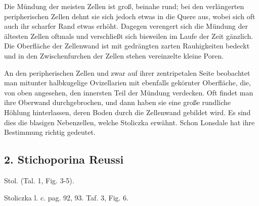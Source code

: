 \documentclass[a4paper, 11pt, oneside, german]{article}
\begin{document}
Die Mündung der meisten Zellen ist groß, beinahe rund; bei den verlängerten peripherischen Zellen dehnt sie sich jedoch etwas in die Quere aus, wobei sich oft auch ihr scharfer Rand etwas erhöht. Dagegen verengert sich die Mündung der ältesten Zellen oftmals und verschließt sich bisweilen im Laufe der Zeit gänzlich. Die Oberfläche der Zellenwand ist mit gedrängten zarten Rauhigkeiten bedeckt und in den Zwischenfurchen der Zellen stehen vereinzelte kleine Poren.

An den peripherischen Zellen und zwar auf ihrer zentripetalen Seite beobachtet man mitunter halbkugelige Ovizellarien mit ebenfalls gekörnter Oberfläche, die, von oben angesehen, den innersten Teil der Mündung verdecken. Oft findet man ihre Oberwand durchgebrochen, und dann haben sie eine große rundliche Höhlung hinterlassen, deren Boden durch die Zellenwand gebildet wird. Es sind dies die blasigen Nebenzellen, welche Stoliczka erwähnt. Schon Lonsdale hat ihre Bestimmung richtig gedeutet.
\subsection{2. Stichoporina Reussi}
\begin{center}
Stol. (Tal. 1, Fig. 3-5).

Stoliczka l. c. pag. 92, 93. Taf. 3, Fig. 6.
\end{center}
\end{document}

